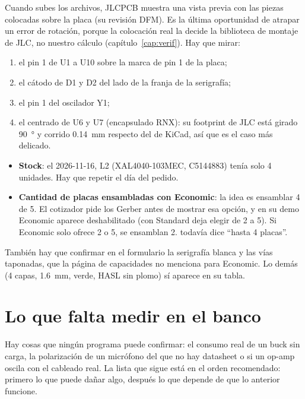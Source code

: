Cuando subes los archivos, JLCPCB muestra una vista previa con las piezas colocadas sobre la placa (su revisión DFM).
Es la última oportunidad de atrapar un error de rotación, porque la colocación real la decide la biblioteca de montaje
de JLC, no nuestro cálculo (capítulo~\ref{cap:verif}). Hay que mirar:

\begin{enumerate}
  \item el pin 1 de U1 a U10 sobre la marca de pin 1 de la placa;
  \item el cátodo de D1 y D2 del lado de la franja de la serigrafía;
  \item el pin 1 del oscilador Y1;
  \item el centrado de U6 y U7 (encapsulado RNX): su footprint de JLC está girado \SI{90}{\degree} y corrido
  \SI{0.14}{\milli\meter} respecto del de KiCad, así que es el caso más delicado.
\end{enumerate}

\begin{ojo}
\begin{itemize}
  \item \textbf{Stock}: el 2026-11-16, L2 (XAL4040-103MEC, C5144883) tenía solo 4 unidades. Hay que repetir
   el día del pedido.
  \item \textbf{Cantidad de placas ensambladas con Economic}: la idea es ensamblar 4 de 5. El cotizador pide los
  Gerber antes de mostrar esa opción, y en su demo Economic aparece deshabilitado (con Standard deja elegir de 2 a 5).
  Si Economic solo ofrece 2 o 5, se ensamblan 2.  todavía dice ``hasta 4 placas''.
\end{itemize}
También hay que confirmar en el formulario la serigrafía blanca y las vías taponadas, que la página de capacidades no
menciona para Economic. Lo demás (4 capas, \SI{1.6}{\milli\meter}, verde, HASL sin plomo) sí aparece en su tabla.
\end{ojo}

\section{Lo que falta medir en el banco}\label{sec:c12-banco}

Hay cosas que ningún programa puede confirmar: el consumo real de un buck sin carga, la polarización de un micrófono
del que no hay datasheet o si un op-amp oscila con el cableado real. La lista que sigue está en el orden recomendado:
primero lo que puede dañar algo, después lo que depende de que lo anterior funcione.

